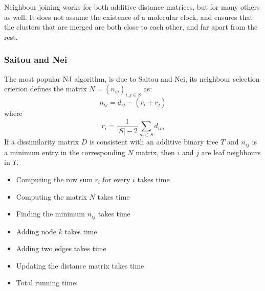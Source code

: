     Neighbour joining works for both additive distance matrices, but for many 
    others as well. It does not assume the existence of a molecular clock, and 
    ensures that the clusters that are merged are both close to each other, and 
    far apart from the rest.
    
    \subsubsection{Saitou and Nei}
    The most popular NJ algorithm, is due to Saitou and Nei, its neighbour 
    selection crierion defines the matrix $N=(n_{ij})_{i,j\in S}$ as:
    \begin{equation*}
        n_{ij}=d_{ij}-(r_i+r_j)
    \end{equation*}
    where
    \begin{equation*}
        r_i = \frac{1}{|S|-2}\sum_{m \in S}d_{im}
    \end{equation*}
    If a dissimilarity matrix $D$ is consistent with an additive binary tree 
    $T$ and $n_{ij}$ is a minimum entry in the corresponding $N$ matrix, then 
    $i$ and $j$ are leaf neighbours in $T$.
    
    \begin{itemize}
        \item Computing the row sum $r_i$ for every $i$ takes  time
        \item Computing the matrix $N$ takes  time
        \item Finding the minimum $n_{ij}$ takes  time
        \item Adding node $k$ takes  time
        \item Adding two edges takes  time
        \item Updating the distance matrix takes  time
        \item Total running time: 
    \end{itemize}
